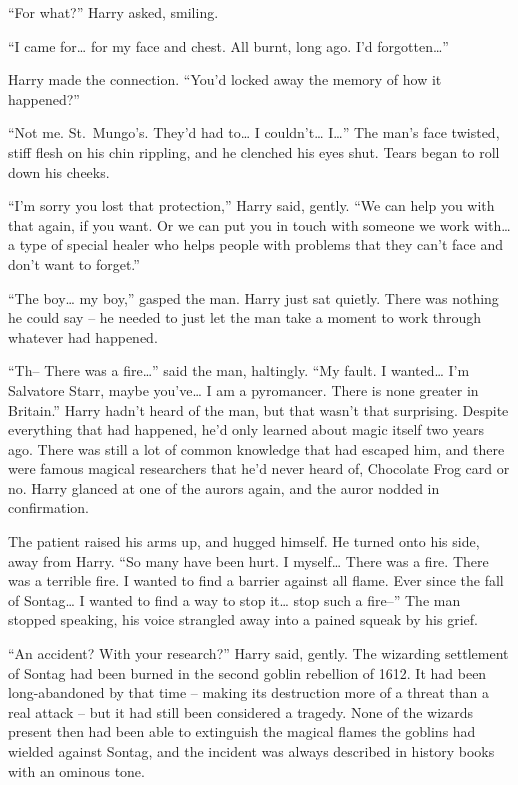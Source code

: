 ``For what?'' Harry asked, smiling.

``I came for\ldots{} for my face and chest. All burnt, long ago. I'd
forgotten\ldots{}''

Harry made the connection. ``You'd locked away the memory of how it
happened?''

``Not me. St.~Mungo's. They'd had to\ldots{} I couldn't\ldots{}
I\ldots{}'' The man's face twisted, stiff flesh on his chin rippling,
and he clenched his eyes shut. Tears began to roll down his cheeks.

``I'm sorry you lost that protection,'' Harry said, gently. ``We can
help you with that again, if you want. Or we can put you in touch with
someone we work with\ldots{} a type of special healer who helps people
with problems that they can't face and don't want to forget.''

``The boy\ldots{} my boy,'' gasped the man. Harry just sat quietly.
There was nothing he could say -- he needed to just let the man take a
moment to work through whatever had happened.

``Th-- There was a fire\ldots{}'' said the man, haltingly. ``My fault. I
wanted\ldots{} I'm Salvatore Starr, maybe you've\ldots{} I am a
pyromancer. There is none greater in Britain.'' Harry hadn't heard of
the man, but that wasn't that surprising. Despite everything that had
happened, he'd only learned about magic itself two years ago. There was
still a lot of common knowledge that had escaped him, and there were
famous magical researchers that he'd never heard of, Chocolate Frog card
or no. Harry glanced at one of the aurors again, and the auror nodded in
confirmation.

The patient raised his arms up, and hugged himself. He turned onto his
side, away from Harry. ``So many have been hurt. I myself\ldots{} There
was a fire. There was a terrible fire. I wanted to find a barrier
against all flame. Ever since the fall of Sontag\ldots{} I wanted to
find a way to stop it\ldots{} stop such a fire--'' The man stopped
speaking, his voice strangled away into a pained squeak by his grief.

``An accident? With your research?'' Harry said, gently. The wizarding
settlement of Sontag had been burned in the second goblin rebellion of
1612. It had been long-abandoned by that time -- making its destruction
more of a threat than a real attack -- but it had still been considered
a tragedy. None of the wizards present then had been able to extinguish
the magical flames the goblins had wielded against Sontag, and the
incident was always described in history books with an ominous tone.

